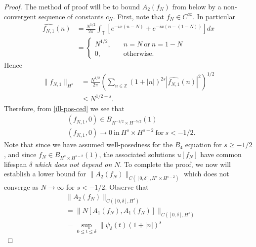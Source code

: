 \documentclass[12pt,reqno]{amsart}
\numberwithin{equation}{section}  %
\newcommand{\zz}{\mathbb{Z}}
\newcommand{\ci}{\mathbb{T}}
\newcommand{\wh}{\widehat}
\begin{document}
\begin{proof}
  The method of proof will be to bound $A_{2}(f_{N})$ from below by a
  non-convergent sequence of constants $c_{N}$.
  First, note that $f_{N} \in C^{\infty}$. In particular
%
%
\begin{equation}
  \label{ill-pos-ce}
\begin{split}
  \wh{f_{N,1}}(n)
  & = \frac{N^{1/2}}{2 \pi} \int_{\ci} [e^{-ix(n - N)} + e^{-ix(n - (1-N))}]  dx  
  \\ 
  & = 
  \begin{cases}
    N^{1/2},  \quad  & n = N \ \text{or} \ n = 1-N
    \\
     0, \quad  & \text{otherwise}.
  \end{cases}
\end{split}
\end{equation}
%
Hence
%
%
\begin{equation}
  \label{ill-pos-ced}
\begin{split}
  \| f_{N,1} \|_{H^{s}}
  & = \frac{N^{1/2}}{2 \pi} \left( \sum_{n \in \zz} (1 + | n |)^{2s} |
  \wh{f_{N,1}}(n) |^{2} \right)^{1/2}
  \\
  & \le N^{1/2+s}.
\end{split}
\end{equation}
%
%
Therefore, from \eqref{ill-pos-ced} we see that 
\begin{equation*}
  \begin{split}
    & (f_{N,1}, 0) \in B_{H^{-1/2} \times H^{-5/2}}(1)
    \\
    & (f_{N,1}, 0) \to 0 \  \text{in}  \ H^{s} \times H^{s-2} \ \text{for} \ s <
    -1/2.
  \end{split}
\end{equation*}
Note that since we have assumed well-posedness for the $B_{4}$ equation for $s
\ge -1/2$, and since $f_{N} \in B_{H^{s} \times H^{s-2}}(1)$, the associated
solutions $u[f_{N}]$ have common lifespan $\delta$ \emph{which does not depend
on $N$}. 
To complete the proof, we now will establish a lower bound for
$\|A_{2}(f_{N})\|_{C([0, \delta], H^{s} \times H^{s-2})}$
which does not converge as $N \to \infty$ for $s < -1/2$. Observe that
%
%
\begin{equation*}
\begin{split}
  & \| A_{2}(f_{N}) \|_{C([0, \delta], H^{s})} 
  \\
  & =  \| N[A_{1}(f_{N}), A_{1}(f_{N})] \|_{C([0, \delta],
  H^{s})} 
  \\
  & = \sup_{0 \le t \le \delta} \| \psi_{\delta}(t) (1 + | n |)^{s}

\end{split}
\end{equation*}
\end{proof}
\end{document}
